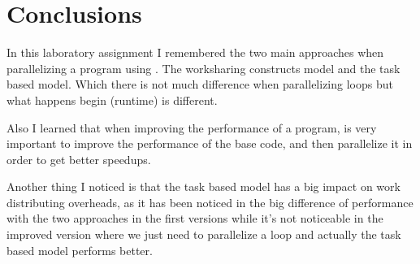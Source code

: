 \section{Conclusions}
In this laboratory assignment I remembered the two main approaches when parallelizing a program using \omp. The worksharing constructs model and the task based model. Which there is not much difference when parallelizing loops but what happens begin (\omp runtime) is different.

\justify
Also I learned that when improving the performance of a program, is very important to improve the performance of the base code, and then parallelize it in order to get better speedups.

\justify
Another thing I noticed is that the task based model has a big impact on work distributing overheads, as it has been noticed in the big difference of performance with the two approaches in the first versions while it's not noticeable in the improved version where we just need to parallelize a loop and actually the task based model performs better.

